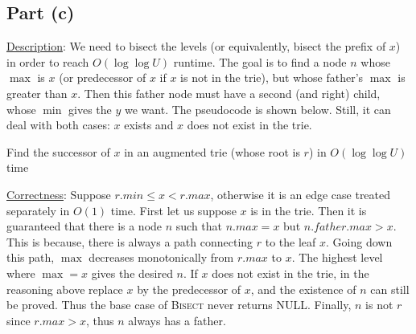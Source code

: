 \documentclass{article}
\begin{document}
\subsection{Part (c)}
\noindent\underline{Description}: We need to bisect the levels (or equivalently, bisect the prefix of $x$) in order to reach $O(\log\log U)$ runtime. The goal is to find a node $n$ whose $\max$ is $x$ (or predecessor of $x$ if $x$ is not in the trie), but whose father's $\max$ is greater than $x$. Then this father node must have a second (and right) child, whose $\min$ gives the $y$ we want. The pseudocode is shown below. Still, it can deal with both cases: $x$ exists and $x$ does not exist in the trie.
\begin{algorithm}
\caption{Find the successor of $x$ in an augmented trie (whose root is $r$) in $O(\log\log U)$ time}
\begin{algorithmic}[1]
	\State{}
\Else{}
	\State{}
\EndIf
\EndProcedure
\State{}
\State{}
\State{}
	\State{}
	\Else
		\State{}
	\Else{}
	\EndIf
\EndIf
\EndProcedure
\end{algorithmic}
\end{algorithm}

\noindent\underline{Correctness}: Suppose $r.min\leqslant x<r.max$, otherwise it is an edge case treated separately in $O(1)$ time. First let us suppose $x$ is in the trie. Then it is guaranteed that there is a node $n$ such that $n.max=x$ but $n.father.max>x$. This is because, there is always a path connecting $r$ to the leaf $x$. Going down this path, $\max$ decreases monotonically from $r.max$ to $x$. The highest level where $\max=x$ gives the desired $n$. If $x$ does not exist in the trie, in the reasoning above replace $x$ by the predecessor of $x$, and the existence of $n$ can still be proved. Thus the base case of \textsc{Bisect} never returns NULL. Finally, $n$ is not $r$ since $r.max>x$, thus $n$ always has a father.
\end{document}
